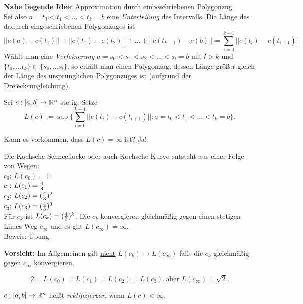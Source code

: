 \documentclass[11pt]{scrbook}
\begin{document}
\textbf{Nahe liegende Idee}: Approximation durch einbeschriebenen Polygonzug \\
Sei also $ a = t_0 < t_1 < \dots < t_k = b$ eine \emph{Unterteilung} des Intervalls. Die Länge des dadurch eingeschriebenen Polygonzuges ist 
\[
	||c(a) - c(t_1)|| + ||c(t_1) - c(t_2)|| + \dots + ||c(t_{k-1}) - c(b)|| = \sum_{i=0}^{k-1} ||c(t_i) - c(t_{i+1})||
\]
Wählt man eine \emph{Verfeinerung} $ a = s_0 < s_1 < s_2 < \dots < s_l = b$ mit $l > k$ und $\{t_0, \dots t_k\} \subset \{s_0, \dots s_l\}$, so erhält man einen Polygonzug, dessen Länge größer gleich der Länge des ursprünglichen Polygonzuges ist (aufgrund der Dreiecksungleichung). 

\begin{df}
Sei $c: [a,b] \to \mathbb{R}^n$ stetig. Setze 
\[
     L(c) := \sup \Big\{ \sum_{i=0}^{k-1} ||c(t_i) - c(t_{i+1})|| : a = t_0 < t_1 < \dots < t_k = b \Big\}.
\]
\end{df}

Kann es vorkommen, dass $L(c) = \infty$ ist? Ja! 

\begin{ex}
Die Kochsche Schneeflocke oder auch Kochsche Kurve entsteht aus einer Folge von Wegen: \\
$c_0$: $L(c_0) = 1$  \\
$c_1$: $L(c_1) = \frac{4}{3}$  \\
$c_2$: $L(c_2) = (\frac{4}{3})^2$  \\
$c_3$: $L(c_3) = (\frac{4}{3})^3$  \\

Für $c_k$ ist $L(c_k) = (\frac{4}{3})^k$. Die $c_k$ konvergieren gleichmäßig gegen einen stetigen Limes-Weg $c_{\infty}$ und es gilt $L(c_{\infty}) = \infty$. \\
Beweis: Übung. \\
\fixme[Bilder]
\end{ex}

\begin{note}
\textbf{Vorsicht:} Im Allgemeinen gilt \underline{nicht} $L(c_k) \to L(c_{\infty})$ falls die $c_k$ gleichmäßig gegen $c_{\infty}$ konvergieren.
\begin{ex*}
\[ 2 = L(c_0) = L(c_1) = L(c_2) = L(c_3), \text{aber } L(c_{\infty}) = \sqrt{2}. \]
\end{ex*}
\fixme[Bilder]
\end{note}

\begin{df}
$c: [a,b] \to \mathbb{R}^n$ heißt \emph{rektifizierbar}, wenn $L(c) < \infty$.
\end{df}
\end{document}
